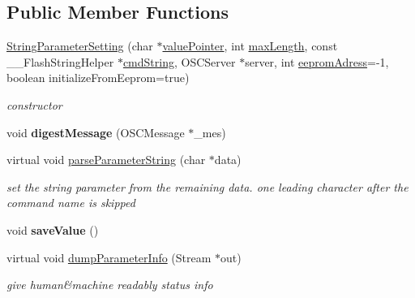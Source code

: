 \subsection*{Public Member Functions}
\begin{DoxyCompactItemize}
\item 
\hyperlink{class_string_parameter_setting_a7427b2114af11abb584a9bf10f591d7f}{String\-Parameter\-Setting} (char $\ast$\hyperlink{class_string_parameter_setting_a9bb351a9ba7b80dc6eef47c0f54fb98c}{value\-Pointer}, int \hyperlink{class_string_parameter_setting_ae04aa807e2f40b0f607d05c4a780a03c}{max\-Length}, const \-\_\-\-\_\-\-Flash\-String\-Helper $\ast$\hyperlink{class_abstract_parameter_setting_a038edb8c34265166b4d7927cf0ee2776}{cmd\-String}, O\-S\-C\-Server $\ast$server, int \hyperlink{class_string_parameter_setting_a4947df623519cd98c5d0ac3194b8c9f1}{eeprom\-Adress}=-\/1, boolean initialize\-From\-Eeprom=true)
\begin{DoxyCompactList}\small\item\em constructor \end{DoxyCompactList}\item 
\hypertarget{class_string_parameter_setting_adec828dedd036d85c0e1c01ec726f5bb}{void {\bfseries digest\-Message} (O\-S\-C\-Message $\ast$\-\_\-mes)}\label{class_string_parameter_setting_adec828dedd036d85c0e1c01ec726f5bb}

\item 
\hypertarget{class_string_parameter_setting_a55259da6ddd7a0922938ed3b815babdc}{virtual void \hyperlink{class_string_parameter_setting_a55259da6ddd7a0922938ed3b815babdc}{parse\-Parameter\-String} (char $\ast$data)}\label{class_string_parameter_setting_a55259da6ddd7a0922938ed3b815babdc}

\begin{DoxyCompactList}\small\item\em set the string parameter from the remaining data. one leading character after the command name is skipped \end{DoxyCompactList}\item 
\hypertarget{class_string_parameter_setting_a8094c55ba7b9a313757d08689805f901}{void {\bfseries save\-Value} ()}\label{class_string_parameter_setting_a8094c55ba7b9a313757d08689805f901}

\item 
\hypertarget{class_string_parameter_setting_a9cd404fbc74d7c815a3a9d952f2bdfec}{virtual void \hyperlink{class_string_parameter_setting_a9cd404fbc74d7c815a3a9d952f2bdfec}{dump\-Parameter\-Info} (Stream $\ast$out)}\label{class_string_parameter_setting_a9cd404fbc74d7c815a3a9d952f2bdfec}

\begin{DoxyCompactList}\small\item\em give human\&machine readably status info \end{DoxyCompactList}\end{DoxyCompactItemize}

